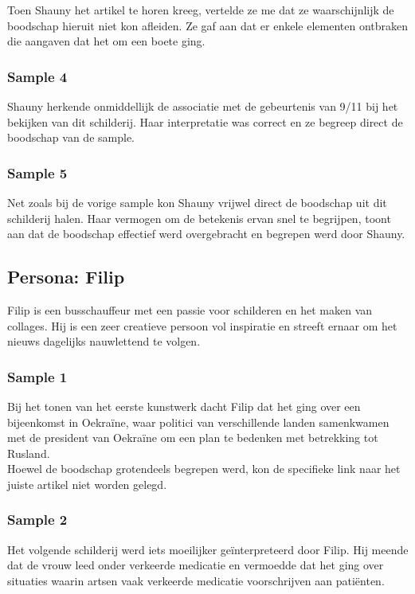 Toen Shauny het artikel te horen kreeg, vertelde ze me dat ze waarschijnlijk de boodschap hieruit niet kon afleiden. Ze gaf aan dat er enkele elementen ontbraken die aangaven dat het om een boete ging.

\subsubsection{Sample 4}
Shauny herkende onmiddellijk de associatie met de gebeurtenis van 9/11 bij het bekijken van dit schilderij. Haar interpretatie was correct en ze begreep direct de boodschap van de sample.

\subsubsection{Sample 5}
Net zoals bij de vorige sample kon Shauny vrijwel direct de boodschap uit dit schilderij halen. Haar vermogen om de betekenis ervan snel te begrijpen, toont aan dat de boodschap effectief werd overgebracht en begrepen werd door Shauny.

\subsection{Persona: Filip}
Filip is een busschauffeur met een passie voor schilderen en het maken van collages. Hij is een zeer creatieve persoon vol inspiratie en streeft ernaar om het nieuws dagelijks nauwlettend te volgen.

\subsubsection{Sample 1}
Bij het tonen van het eerste kunstwerk dacht Filip dat het ging over een bijeenkomst in Oekraïne, waar politici van verschillende landen samenkwamen met de president van Oekraïne om een plan te bedenken met betrekking tot Rusland. \\

Hoewel de boodschap grotendeels begrepen werd, kon de specifieke link naar het juiste artikel niet worden gelegd.

\subsubsection{Sample 2}
Het volgende schilderij werd iets moeilijker geïnterpreteerd door Filip. Hij meende dat de vrouw leed onder verkeerde medicatie en vermoedde dat het ging over situaties waarin artsen vaak verkeerde medicatie voorschrijven aan patiënten. \\

